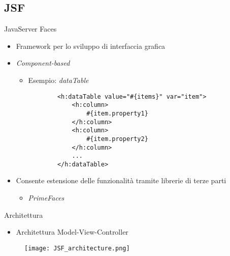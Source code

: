 \subsection{JSF}

\begin{frame}[fragile]{JavaServer Faces}

\begin{itemize}
\item Framework per lo sviluppo di interfaccia grafica

\vspace{0.8em}

\item \textsl{Component-based}
	\begin{itemize}
	
	\vspace{0.5em}
	
	\item Esempio: \textsl{dataTable}
		\begin{lstlisting}
		<h:dataTable value="#{items}" var="item">
		    <h:column>
		        #{item.property1}
		    </h:column>
		    <h:column>
		        #{item.property2}
		    </h:column>
		    ...
		</h:dataTable>
		\end{lstlisting}
	\end{itemize}

\item Consente estensione delle funzionalità tramite librerie di terze parti
	\begin{itemize}
	
	\vspace{0.5em}
	
	\item \textsl{PrimeFaces}
	\end{itemize}
\end{itemize}

\end{frame}


\begin{frame}{Architettura}

\begin{itemize}
\item Architettura Model-View-Controller
\end{itemize}

\begin{figure}
	\centering
	\texttt{[image: JSF\_architecture.png]}
\end{figure}

\end{frame}


